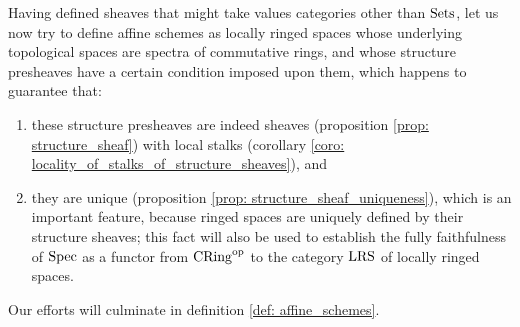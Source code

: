             Having defined sheaves that might take values categories other than $\mathrm{Sets}$, let us now try to define affine schemes as locally ringed spaces whose underlying topological spaces are spectra of commutative rings, and whose structure presheaves have a certain condition imposed upon them, which happens to guarantee that:
                \begin{enumerate}
                    \item these structure presheaves are indeed sheaves (proposition \ref{prop: structure_sheaf}) with local stalks (corollary \ref{coro: locality_of_stalks_of_structure_sheaves}), and
                    \item they are unique (proposition \ref{prop: structure_sheaf_uniqueness}), which is an important feature, because ringed spaces are uniquely defined by their structure sheaves; this fact will also be used to establish the fully faithfulness of $\operatorname{Spec}$ as a functor from $\mathrm{CRing}^{\mathrm{op}}$ to the category $\mathrm{LRS}$ of locally ringed spaces. 
                \end{enumerate}
            Our efforts will culminate in definition \ref{def: affine_schemes}.
                
